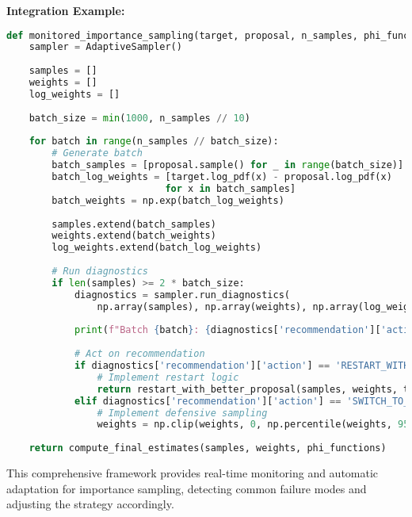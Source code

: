 \documentclass[11pt]{article}
\begin{document}
\textbf{Integration Example:}

\begin{lstlisting}[language=Python, basicstyle=\small]
def monitored_importance_sampling(target, proposal, n_samples, phi_functions):
    sampler = AdaptiveSampler()
    
    samples = []
    weights = []
    log_weights = []
    
    batch_size = min(1000, n_samples // 10)
    
    for batch in range(n_samples // batch_size):
        # Generate batch
        batch_samples = [proposal.sample() for _ in range(batch_size)]
        batch_log_weights = [target.log_pdf(x) - proposal.log_pdf(x) 
                            for x in batch_samples]
        batch_weights = np.exp(batch_log_weights)
        
        samples.extend(batch_samples)
        weights.extend(batch_weights)
        log_weights.extend(batch_log_weights)
        
        # Run diagnostics
        if len(samples) >= 2 * batch_size:
            diagnostics = sampler.run_diagnostics(
                np.array(samples), np.array(weights), np.array(log_weights))
            
            print(f"Batch {batch}: {diagnostics['recommendation']['action']}")
            
            # Act on recommendation
            if diagnostics['recommendation']['action'] == 'RESTART_WITH_ADAPTIVE_PROPOSAL':
                # Implement restart logic
                return restart_with_better_proposal(samples, weights, target, phi_functions)
            elif diagnostics['recommendation']['action'] == 'SWITCH_TO_DEFENSIVE':
                # Implement defensive sampling
                weights = np.clip(weights, 0, np.percentile(weights, 95))
    
    return compute_final_estimates(samples, weights, phi_functions)
\end{lstlisting}

This comprehensive framework provides real-time monitoring and automatic adaptation for importance sampling, detecting common failure modes and adjusting the strategy accordingly.
\end{document}
